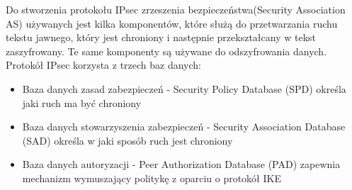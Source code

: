\documentclass[12p]{article}
\begin{document}
 Do stworzenia protokołu IPsec zrzeszenia bezpieczeństwa(Security Association AS) używanych jest kilka komponentów, które służą do przetwarzania ruchu tekstu jawnego, który jest chroniony i następnie przekształcany w tekst zaszyfrowany. Te same komponenty są używane do odszyfrowania danych. Protokół IPsec korzysta z trzech baz danych: 
\begin{itemize}
\item Baza danych zasad zabezpieczeń - Security Policy Database (SPD) określa jaki ruch ma być chroniony
\item Baza danych stowarzyszenia zabezpieczeń - Security Association Database (SAD) określa w jaki sposób ruch jest chroniony
\item Baza danych autoryzacji - Peer Authorization Database (PAD) zapewnia mechanizm wymuszający  politykę z oparciu o protokół IKE
\end{itemize}
\end{document}
